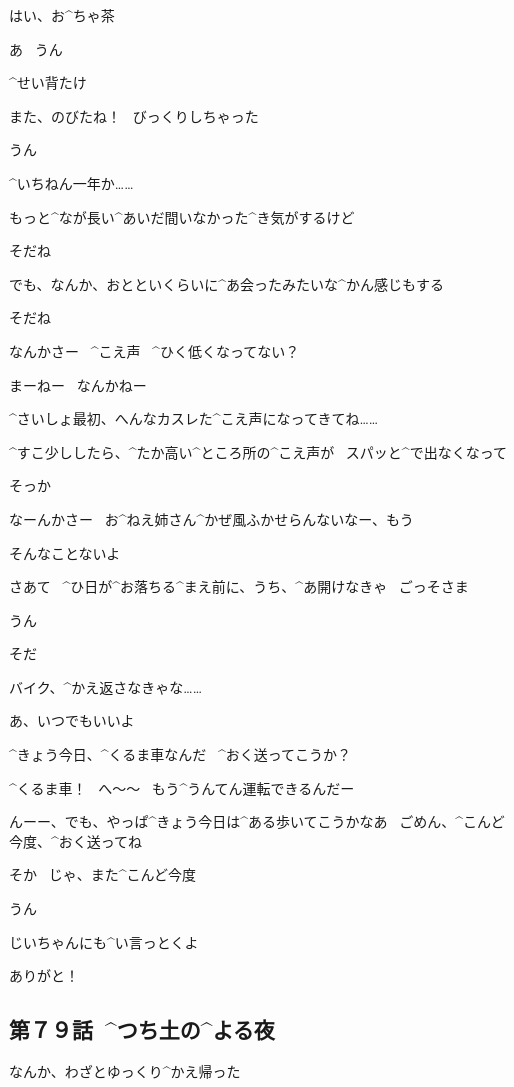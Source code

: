 \T はい、お^{ちゃ}{茶}

\A あ
\ うん

\A ^{せい}{背}たけ

\A また、のびたね！
\ びっくりしちゃった

\T うん

\page
\T ^{いちねん}{一年}か……

\T もっと^{なが}{長}い^{あいだ}{間}いなかった^{き}{気}がするけど

\A そだね

\T でも、なんか、おとといくらいに^{あ}{会}ったみたいな^{かん}{感}じもする

\A そだね

\A なんかさー
\ ^{こえ}{声}
\ ^{ひく}{低}くなってない？

\T まーねー
\ なんかねー

\page
\T ^{さいしょ}{最初}、へんなカスレた^{こえ}{声}になってきてね……

\T ^{すこ}{少}ししたら、^{たか}{高}い^{ところ}{所}の^{こえ}{声}が
\ スパッと^{で}{出}なくなって

\A そっか

\A なーんかさー
\ お^{ねえ}{姉}さん^{かぜ}{風}ふかせらんないなー、もう

\T そんなことないよ

\page[25]
\A さあて
\ ^{ひ}{日}が^{お}{落}ちる^{まえ}{前}に、うち、^{あ}{開}けなきゃ
\ ごっそさま

\T うん

\T そだ

\T バイク、^{かえ}{返}さなきゃな……

\A あ、いつでもいいよ

\T ^{きょう}{今日}、^{くるま}{車}なんだ
\ ^{おく}{送}ってこうか？

\A ^{くるま}{車}！
\ へ〜〜
\ もう^{うんてん}{運転}できるんだー

\page
\A んーー、でも、やっぱ^{きょう}{今日}は^{ある}{歩}いてこうかなあ
\ ごめん、^{こんど}{今度}、^{おく}{送}ってね

\T そか
\ じゃ、また^{こんど}{今度}

\A うん

\page
\T じいちゃんにも^{い}{言}っとくよ

\A ありがと！


\subsection{第７９話\ ^{つち}{土}の^{よる}{夜}}

\page[30]
\A なんか、わざとゆっくり^{かえ}{帰}った

